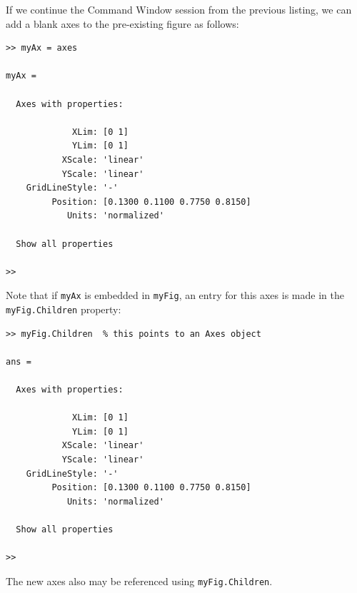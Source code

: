 If we continue the Command Window session from the previous listing, we can add a blank axes to the pre-existing figure as follows:
\begin{lstlisting}[style=Matlab-editor, caption={A new, blank axes is added to the figure.}]
>> myAx = axes

myAx = 

  Axes with properties:

             XLim: [0 1]
             YLim: [0 1]
           XScale: 'linear'
           YScale: 'linear'
    GridLineStyle: '-'
         Position: [0.1300 0.1100 0.7750 0.8150]
            Units: 'normalized'

  Show all properties

>> 
\end{lstlisting}
Note that if \texttt{myAx} is embedded in \texttt{myFig},  an entry for this axes is made in the \texttt{myFig.Children} property:
\begin{lstlisting}[style=Matlab-editor, caption={When \texttt{myAx} is embedded in \texttt{myFig}, the \texttt{myFig.Children} property also may be used to reference the new axes object.}]
>> myFig.Children  % this points to an Axes object

ans = 

  Axes with properties:

             XLim: [0 1]
             YLim: [0 1]
           XScale: 'linear'
           YScale: 'linear'
    GridLineStyle: '-'
         Position: [0.1300 0.1100 0.7750 0.8150]
            Units: 'normalized'

  Show all properties

>>
\end{lstlisting}
The new axes also may be referenced using \texttt{myFig.Children}.

